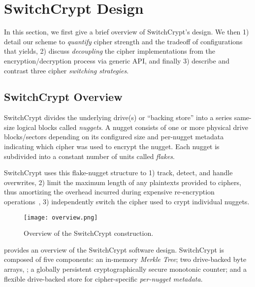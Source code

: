 \section{SwitchCrypt Design}\label{sec:design}

In this section, we first give a brief overview of SwitchCrypt's design. We then
1) detail our scheme to \emph{quantify} cipher strength and the tradeoff of
configurations that yields, 2) discuss \emph{decoupling} the cipher
implementations from the encryption/decryption process via generic API, and
finally 3) describe and contrast three cipher \emph{switching strategies}.

\subsection{SwitchCrypt Overview}

SwitchCrypt divides the underlying drive(s) or ``backing store'' into a series
same-size logical blocks called \emph{nuggets}. A nugget consists of one or more
physical drive blocks/sectors depending on its configured size and per-nugget
metadata indicating which cipher was used to encrypt the nugget. Each nugget is
subdivided into a constant number of units called \emph{flakes}.

SwitchCrypt uses this flake-nugget structure to 1) track, detect, and handle
overwrites, 2) limit the maximum length of any plaintexts provided to ciphers,
thus amortizing the overhead incurred during expensive re-encryption
operations~\cite{StrongBox}, 3) independently switch the cipher used to crypt
individual nuggets.


\begin{figure}[ht]
   \centering
   \texttt{[image: overview.png]}
   \caption{Overview of the SwitchCrypt construction.}\label{fig:overview}
\end{figure}

 provides an overview of the SwitchCrypt software design.
SwitchCrypt is composed of five components: an in-memory \emph{Merkle Tree}; two
drive-backed byte arrays, ; a globally persistent cryptographically secure
monotonic counter; and a flexible drive-backed store for cipher-specific
\emph{per-nugget metadata}.

